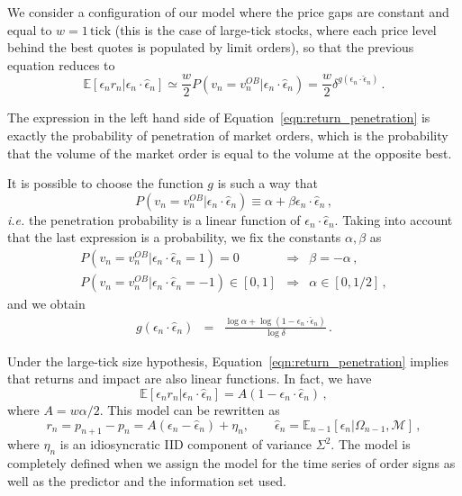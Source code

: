 \documentclass[12pt]{iopart}
\begin{document}
We consider a configuration of our model where the price gaps are constant and equal to $w=1\,\mathrm{tick}$ (this is the case of large-tick stocks, where each price level behind the best quotes is populated by limit orders), so that the previous equation reduces to
\begin{equation}
\mathbb{E}[\epsilon_n r_n|\epsilon_n\cdot\hat{\epsilon}_n] \simeq \frac{w}{2}P\left(v_n = v_n^{OB}\big|\epsilon_n\cdot\hat{\epsilon}_n\right) =\frac{w}{2}\delta^{g(\epsilon_n\cdot\hat{\epsilon}_n)}\,.
\label{eqn:return_penetration}
\end{equation}

The expression in the left hand side of Equation~\ref{eqn:return_penetration} is exactly the probability of penetration of market orders, which is the probability that the volume of the market order is equal to the volume at the opposite best. 

It is possible to choose the function $g$ is such a way that
\begin{equation*}
P\left(v_n = v_n^{OB}\big|\epsilon_n\cdot\hat{\epsilon}_n\right)\equiv\alpha+\beta\epsilon_n\cdot\hat{\epsilon}_n\,,
\end{equation*}
\textit{i.e.} the penetration probability is a linear function of $\epsilon_n\cdot\hat{\epsilon}_n$. Taking into account that the last expression is a probability, we fix the constants $\alpha, \beta$ as
\begin{eqnarray*}
P\left(v_n = v_n^{OB}\big|\epsilon_n\cdot\hat{\epsilon}_n=1\right)=0 &\Longrightarrow& \beta=-\alpha \,,\\
P\left(v_n = v_n^{OB}\big|\epsilon_n\cdot\hat{\epsilon}_n=-1\right)\in[0,1] &\Longrightarrow& \alpha\in[0,1/2]\,,
\end{eqnarray*}
and we obtain
\begin{eqnarray*}
g(\epsilon_n\cdot\hat{\epsilon}_n)&=&\frac{\log\alpha+\log(1-\epsilon_n\cdot\hat{\epsilon}_n)}{\log\delta}\,. 
\end{eqnarray*}

Under the large-tick size hypothesis, Equation~\ref{eqn:return_penetration} implies that returns and impact are also linear functions. In fact, we have
\begin{equation*}
\mathbb{E}[\epsilon_n r_n|\epsilon_n\cdot\hat{\epsilon}_n]=A(1-\epsilon_n\cdot\hat{\epsilon}_n)\,,
\end{equation*}
where $A=w \alpha/2$. This model can be rewritten as
\begin{equation}
r_n=p_{n+1}-p_n=A(\epsilon_n-\hat{\epsilon}_n)+\eta_n,\qquad \hat{\epsilon}_n=\mathbb{E}_{n-1}[\epsilon_n|\Omega_{n-1},\mathcal{M}]\,,
\label{eqn:efficient_model}
\end{equation}
where $\eta_n$ is an idiosyncratic IID component of variance $\Sigma^2$. The model is completely defined when we assign the model for the time series of order signs as well as the predictor and the information set used. 
\end{document}
